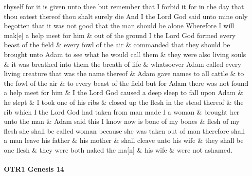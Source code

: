 thyself for it is given unto thee but remember that I forbid it for in the day that thou eatest thereof thou shalt surely die And I the Lord God said unto mine only begotten that it was not good that the man should be alone Wherefore I will mak[e] a help meet for him \& out of the ground I the Lord God formed every beast of the field \& every fowl of the air \& commanded that they should be brought unto Adam to see what he would call them \& they were also living souls \& it was breathed into them the breath of life \& whatsoever Adam called every living creature that was the name thereof \& Adam gave names to all cattle \& to the fowl of the air \& to every beast of the field but for Adam there was not found a help meet for him \& I the Lord God caused a deep sleep to fall upon Adam \& he slept \& I took one of his ribs \& closed up the flesh in the stead thereof \& the rib which I the Lord God had taken from man made I a woman \& brought her unto the man \& Adam said this I know now is bone of my bones \& flesh of my flesh she shall be called woman because she was taken out of man therefore shall a man leave his father \& his mother \& shall cleave unto his wife \& they shall be one flesh \& they were both naked the ma[n] \& his wife \& were not ashamed.
	
	\paragraph{OTR1 Genesis 14}
		\label{JST-OTR1-GENESIS-14}
		
